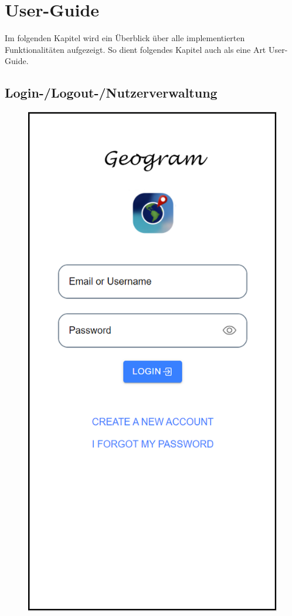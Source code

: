 \chapter{User-Guide\label{chap4:Viertes-Kapitel}}

Im folgenden Kapitel wird ein Überblick über alle implementierten Funktionalitäten aufgezeigt. So dient folgendes Kapitel auch als eine Art \glqq User-Guide\grqq{}.

\section{Login-/Logout-/Nutzerverwaltung\label{sec4.1:Unterpunkt-1}}

\begin{figure}[H]
    \centering
    \begin{minipage}{.4\textwidth}
        \begin{center}
            \includegraphics[width=0.8\linewidth]{images/Login.png}

\end{center}
\end{minipage}
\end{figure}
